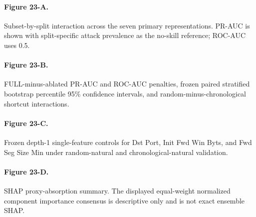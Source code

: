 

\paragraph{Figure 23-A.}
Subset-by-split interaction across the seven primary representations. PR-AUC is shown
with split-specific attack prevalence as the no-skill reference; ROC-AUC uses 0.5.

\paragraph{Figure 23-B.}
FULL-minus-ablated PR-AUC and ROC-AUC penalties, frozen paired stratified bootstrap
percentile 95\% confidence intervals, and random-minus-chronological shortcut
interactions.

\paragraph{Figure 23-C.}
Frozen depth-1 single-feature controls for Dst Port, Init Fwd Win Byts, and
Fwd Seg Size Min under random-natural and chronological-natural validation.

\paragraph{Figure 23-D.}
SHAP proxy-absorption summary. The displayed equal-weight normalized component
importance consensus is descriptive only and is not exact ensemble SHAP.
